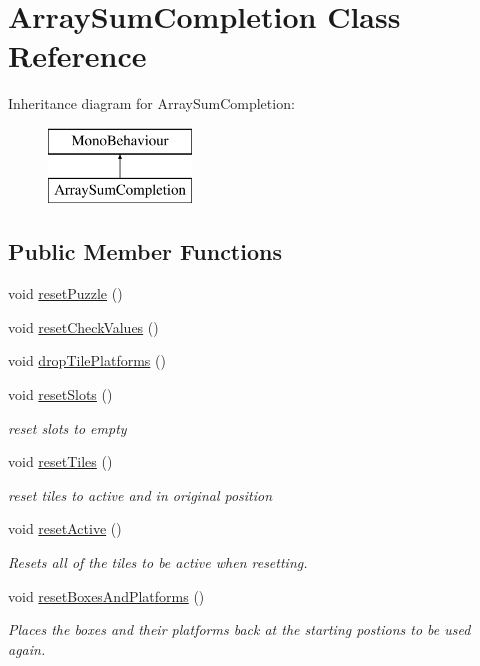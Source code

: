\hypertarget{class_array_sum_completion}{}\section{Array\+Sum\+Completion Class Reference}
\label{class_array_sum_completion}
Inheritance diagram for Array\+Sum\+Completion\+:\begin{figure}[H]
\begin{center}
\leavevmode
\includegraphics[height=2.000000cm]{class_array_sum_completion}
\end{center}
\end{figure}
\subsection*{Public Member Functions}
\begin{DoxyCompactItemize}
\item 
void \hyperlink{class_array_sum_completion_a7ebbac41382a93bf539032555a3c9bd9}{reset\+Puzzle} ()
\item 
void \hyperlink{class_array_sum_completion_a3ae23072215cde0cdce19c8f8b773b7b}{reset\+Check\+Values} ()
\item 
void \hyperlink{class_array_sum_completion_ac1c819eeab2598e8c2c2e1e78e15a666}{drop\+Tile\+Platforms} ()
\item 
void \hyperlink{class_array_sum_completion_a033797d55e28346be6d4821f3bdc2daa}{reset\+Slots} ()
\begin{DoxyCompactList}\small\item\em reset slots to empty \end{DoxyCompactList}\item 
void \hyperlink{class_array_sum_completion_a9219153273ef00f35c1ccb98cf408af3}{reset\+Tiles} ()
\begin{DoxyCompactList}\small\item\em reset tiles to active and in original position \end{DoxyCompactList}\item 
void \hyperlink{class_array_sum_completion_a9c8cbe4d07015cd0e6c958e39e0e92d2}{reset\+Active} ()
\begin{DoxyCompactList}\small\item\em Resets all of the tiles to be active when resetting. \end{DoxyCompactList}\item 
void \hyperlink{class_array_sum_completion_a1289c469259345582c0227f7a617a19f}{reset\+Boxes\+And\+Platforms} ()
\begin{DoxyCompactList}\small\item\em Places the boxes and their platforms back at the starting postions to be used again. \end{DoxyCompactList}\end{DoxyCompactItemize}
